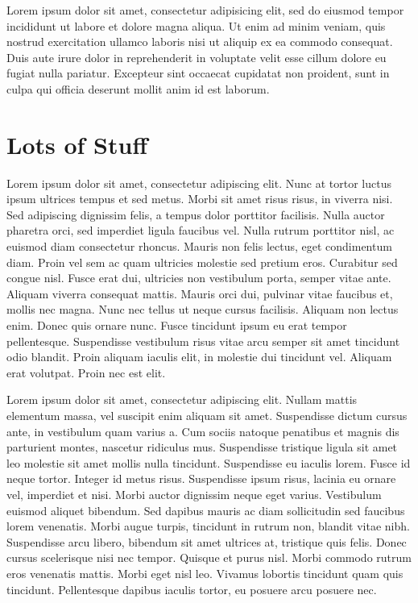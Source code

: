 \documentclass{chi-ext}
\begin{document}
\begin{multicols}{2}
Lorem ipsum dolor sit amet, consectetur adipisicing elit, sed do eiusmod tempor incididunt ut labore
et dolore magna aliqua. Ut enim ad minim veniam, quis nostrud exercitation ullamco laboris nisi ut
aliquip ex ea commodo consequat. Duis aute irure dolor in reprehenderit in voluptate velit esse
cillum dolore eu fugiat nulla pariatur. Excepteur sint occaecat cupidatat non proident, sunt in
culpa qui officia deserunt mollit anim id est laborum.

\section{Lots of Stuff}

Lorem ipsum dolor sit amet, consectetur adipiscing elit. Nunc at tortor luctus ipsum ultrices tempus
et sed metus. Morbi sit amet risus risus, in viverra nisi. Sed adipiscing dignissim felis, a tempus
dolor porttitor facilisis. Nulla auctor pharetra orci, sed imperdiet ligula faucibus vel. Nulla
rutrum porttitor nisl, ac euismod diam consectetur rhoncus. Mauris non felis lectus, eget
condimentum diam. Proin vel sem ac quam ultricies molestie sed pretium eros. Curabitur sed congue
nisl. Fusce erat dui, ultricies non vestibulum porta, semper vitae ante. Aliquam viverra consequat
mattis. Mauris orci dui, pulvinar vitae faucibus et, mollis nec magna. Nunc nec tellus ut neque
cursus facilisis. Aliquam non lectus enim. Donec quis ornare nunc. Fusce tincidunt ipsum eu erat
tempor pellentesque. Suspendisse vestibulum risus vitae arcu semper sit amet tincidunt odio blandit.
Proin aliquam iaculis elit, in molestie dui tincidunt vel. Aliquam erat volutpat. Proin nec est
elit.

Lorem ipsum dolor sit amet, consectetur adipiscing elit. Nullam mattis elementum massa, vel suscipit
enim aliquam sit amet. Suspendisse dictum cursus ante, in vestibulum quam varius a. Cum sociis
natoque penatibus et magnis dis parturient montes, nascetur ridiculus mus. Suspendisse tristique
ligula sit amet leo molestie sit amet mollis nulla tincidunt. Suspendisse eu iaculis lorem. Fusce id
neque tortor. Integer id metus risus. Suspendisse ipsum risus, lacinia eu ornare vel, imperdiet et
nisi. Morbi auctor dignissim neque eget varius. Vestibulum euismod aliquet bibendum. Sed dapibus
mauris ac diam sollicitudin sed faucibus lorem venenatis. Morbi augue turpis, tincidunt in rutrum
non, blandit vitae nibh. Suspendisse arcu libero, bibendum sit amet ultrices at, tristique quis
felis. Donec cursus scelerisque nisi nec tempor. Quisque et purus nisl. Morbi commodo rutrum eros
venenatis mattis. Morbi eget nisl leo. Vivamus lobortis tincidunt quam quis tincidunt. Pellentesque
dapibus iaculis tortor, eu posuere arcu posuere nec.


\end{multicols}
\end{document}
